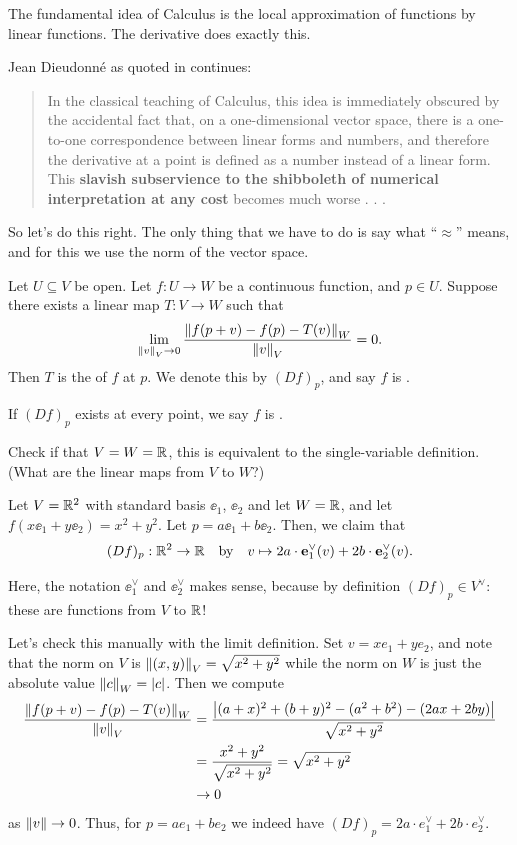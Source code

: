 \begin{moral}
	The fundamental idea of Calculus is the local approximation of functions by linear functions.
	The derivative does exactly this.
\end{moral}
Jean Dieudonn\'e as quoted in \cite{ref:pugh} continues:
\begin{quote}
	In the classical teaching of Calculus, this idea is immediately obscured
	by the accidental fact that, on a one-dimensional vector space,
	there is a one-to-one correspondence between linear forms and numbers,
	and therefore the derivative at a point is defined as a number instead of a linear form.
	This \textbf{slavish subservience to the shibboleth of numerical interpretation at any cost}
	becomes much worse . . .
\end{quote}

So let's do this right.
The only thing that we have to do is say what ``$\approx$'' means, and for
this we use the norm of the vector space.
\begin{definition}
	Let $U \subseteq V$ be open.
	Let $f : U \to W$ be a continuous function, and $p \in U$.
	Suppose there exists a linear map $T : V \to W$ such that
	\[
		\lim_{\left\lVert v \right\rVert_V \to 0}
		\frac{\left\lVert f(p + v) - f(p) - T(v) \right\rVert_W}{\left\lVert v \right\rVert_V} = 0.
	\]
	Then $T$ is the  of $f$ at $p$.
	We denote this by $(Df)_p$, and say $f$ is .

	If $(Df)_p$ exists at every point, we say $f$ is .
\end{definition}

\begin{ques}
	Check if that $V = W = \mathbb R$, this is equivalent to the single-variable definition.
	(What are the linear maps from $V$ to $W$?)
\end{ques}
\begin{example}[Total derivative of $f(x,y) = x^2+y^2$]
	Let $V = \mathbb R^2$ with standard basis $\ee_1$, $\ee_2$ and let $W = \mathbb R$,
	and let $f\left( x \ee_1 + y \ee_2 \right) = x^2+y^2$.  Let $p = a\ee_1 + b\ee_2$.
	Then, we claim that \[ (Df)_p : \mathbb R^2 \to \mathbb R \quad\text{by}\quad
	v \mapsto 2a \cdot \mathbf e_1^\vee(v) + 2b \cdot \mathbf e_2^\vee(v). \]
\end{example}
Here, the notation $\ee_1^\vee$ and $\ee_2^\vee$ makes sense,
because by definition $(Df)_p \in V^\vee$: these are functions from $V$ to $\mathbb R$!

Let's check this manually with the limit definition.
Set $v = xe_1 + ye_2$, and note that the norm on $V$ is $\left\lVert (x,y) \right\rVert_V = \sqrt{x^2+y^2}$
while the norm on $W$ is just the absolute value $\left\lVert c \right\rVert_W = \left\lvert c \right\rvert$.
Then we compute
\begin{align*}
	\frac{\left\lVert f(p + v) - f(p) - T(v) \right\rVert_W}{\left\lVert v \right\rVert_V} 
	&= \frac{\left\lvert (a+x)^2 + (b+y)^2 - (a^2+b^2) - (2ax+2by) \right\rvert}{\sqrt{x^2+y^2}} \\
	&= \frac{x^2+y^2}{\sqrt{x^2+y^2}} = \sqrt{x^2+y^2} \\
	&\to 0
\end{align*}
as $\left\lVert v \right\rVert \to 0$.
Thus, for $p = ae_1 + be_2$ we indeed have $(Df)_p = 2a \cdot e_1^\vee + 2b \cdot e_2^\vee$.

